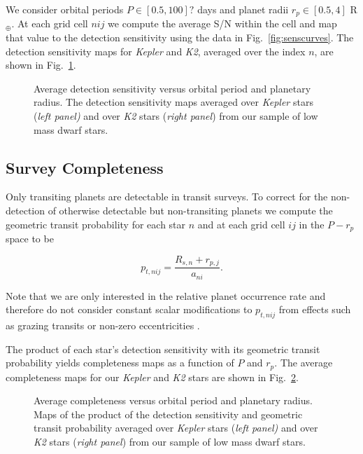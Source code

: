 \documentclass[twocolumn]{emulateapj}
\newcommand{\kepler}[1]{\emph{Kepler}#1}
\newcommand{\ktwo}[1]{\emph{K2}#1}
\begin{document}
We consider orbital periods $P \in [0.5,100]?$ days and planet radii $r_p \in [0.5,4]$ R$_{\oplus}$. At
each grid cell $nij$ we compute the average S/N within the cell and map that value to the detection sensitivity
using the data in Fig.~\ref{fig:senscurves}. The detection sensitivity maps for \kepler{} and \ktwo{,}
averaged over the index $n$, are shown in Fig.~\ref{fig:sensmap}.

 

\begin{figure}
  \centering
  \caption{Average detection sensitivity versus orbital period and planetary radius.
    The detection sensitivity maps averaged over \kepler{} stars (\emph{left panel)} and over \ktwo{} stars
    (\emph{right panel}) from our sample of low mass dwarf stars.} 
  \label{fig:sensmap}
\end{figure}


\subsection{Survey Completeness}
Only transiting planets are detectable in transit surveys. To correct for the non-detection of otherwise
detectable but non-transiting planets we compute
the geometric transit probability for each star $n$ and at each grid cell $ij$ in the $P-r_p$ space to be

\begin{equation}
  p_{t,nij} = \frac{R_{s,n} + r_{p,j}}{a_{ni}}. \label{eq:ptransit}
\end{equation}

\noindent Note that we are only interested in the relative planet occurrence rate and therefore do not consider
constant scalar modifications to $p_{t,nij}$ from effects such as grazing transits or non-zero eccentricities 
\citep{barnes07b}.

The product of each star's detection sensitivity with its geometric transit probability yields completeness
maps as a function of $P$ and $r_p$. The average completeness maps for our \kepler{} and \ktwo{} stars are
shown in Fig.~\ref{fig:compmap}.

\begin{figure}
  \centering
  \caption{Average completeness versus orbital period and planetary radius.
    Maps of the product of the detection sensitivity and geometric transit probability averaged over \kepler{} stars
    (\emph{left panel)} and over \ktwo{} stars (\emph{right panel}) from our sample of low mass dwarf stars.} 
  \label{fig:compmap}
\end{figure}
\end{document}
